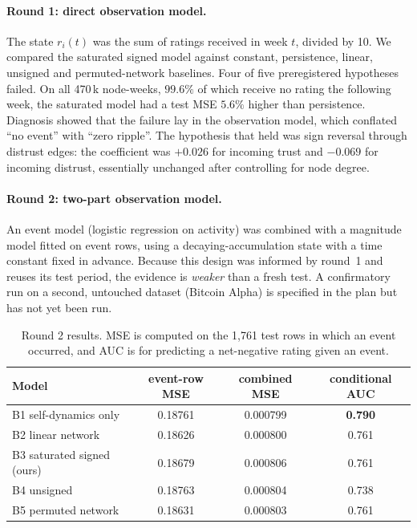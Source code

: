 \documentclass[11pt]{article}
\theoremstyle{definition}
\theoremstyle{remark}
\begin{document}
\paragraph{Round 1: direct observation model.} The state $r_i(t)$ was the sum of ratings received in
week $t$, divided by 10. We compared the saturated signed model against constant, persistence, linear,
unsigned and permuted-network baselines. Four of five preregistered hypotheses failed. On all 470\,k
node-weeks, $99.6\%$ of which receive no rating the following week, the saturated model had a test MSE
$5.6\%$ higher than persistence. Diagnosis showed that the failure lay in the observation model, which
conflated ``no event'' with ``zero ripple''. The hypothesis that held was sign reversal through distrust
edges: the coefficient was $+0.026$ for incoming trust and $-0.069$ for incoming distrust, essentially
unchanged after controlling for node degree.

\paragraph{Round 2: two-part observation model.} An event model (logistic regression on activity) was
combined with a magnitude model fitted on event rows, using a decaying-accumulation state with a time
constant fixed in advance. Because this design was informed by round~1 and reuses its test period, the
evidence is \emph{weaker} than a fresh test. A confirmatory run on a second, untouched dataset (Bitcoin
Alpha) is specified in the plan but has not yet been run.

\begin{table}[h]
\centering
\caption{Round 2 results. MSE is computed on the 1{,}761 test rows in which an event occurred, and AUC
is for predicting a net-negative rating given an event.}
\begin{tabular}{@{}lccc@{}}
\toprule
Model & event-row MSE & combined MSE & conditional AUC \\
\midrule
B1 self-dynamics only & 0.18761 & 0.000799 & \textbf{0.790} \\
B2 linear network & 0.18626 & 0.000800 & 0.761 \\
B3 saturated signed (ours) & 0.18679 & 0.000806 & 0.761 \\
B4 unsigned & 0.18763 & 0.000804 & 0.738 \\
B5 permuted network & 0.18631 & 0.000803 & 0.761 \\
\bottomrule
\end{tabular}
\end{table}
\end{document}
